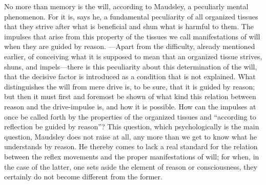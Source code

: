 \documentclass[12pt,a4paper,openany]{book}
\newcommand{\opage}[1]{\marginnote{\footnotesize\textit{[#1]}}}
\begin{document}
No more than memory is the will, according to Maudsley,
a peculiarly mental phenomenon. For it is, says
he, a fundamental peculiarity of all organized tissues
that they strive after what is beneficial and shun what
is harmful to them. The impulses that arise from
this property of the tissues we call manifestations of will when
they are guided by reason. ---Apart from the difficulty, already
mentioned earlier, of conceiving what it is supposed to mean that
an organized tissue strives, shuns, and impels---there is
this peculiarity about this determination of the will, that the
decisive factor is introduced as a condition that is not explained.
What distinguishes the will from mere drive is, to be
sure, that it is guided by reason; but then it must first
and foremost be shown of what kind this relation between reason
and the drive-impulse is, and how it is possible.
How can the impulses at once be called forth by
the properties of the organized tissues and ``according to reflection
be guided by reason''? This question, which psychologically
is the main question, Maudsley does not raise at all, any more
than we get to know what he understands by reason. He thereby
comes to lack a real standard for
the relation between the reflex movements and the proper manifestations of%
\opage{321} will; for when, in the case of the latter, one sets aside the element of reason
or consciousness, they certainly do not become
different from the former.
\end{document}
